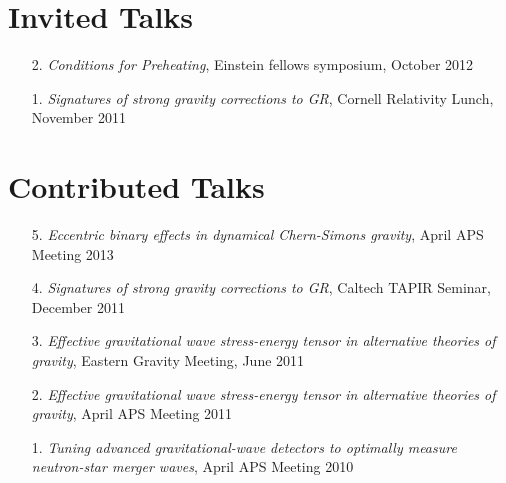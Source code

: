 \section{\sc Invited Talks}
\begin{enumerate}
\item[{2.}] {\it Conditions for Preheating},
  Einstein fellows symposium, October 2012
\item[{1.}] {\it Signatures of strong gravity corrections to GR},
  Cornell Relativity Lunch, November 2011
\end{enumerate}

\section{\sc Contributed Talks}
\begin{enumerate}
\item[{5.}] {\it Eccentric binary effects in dynamical Chern-Simons gravity},
  April APS Meeting 2013
\item[{4.}] {\it Signatures of strong gravity corrections to GR},
  Caltech TAPIR Seminar, December 2011
\item[{3.}] {\it Effective gravitational wave stress-energy tensor in
    alternative theories of gravity}, Eastern Gravity Meeting, June 2011
\item[{2.}] {\it Effective gravitational wave stress-energy tensor in alternative theories of gravity}, April APS Meeting 2011
\item[{1.}] {\it Tuning advanced gravitational-wave detectors to
    optimally measure neutron-star merger waves}, April APS Meeting 2010
\end{enumerate}
